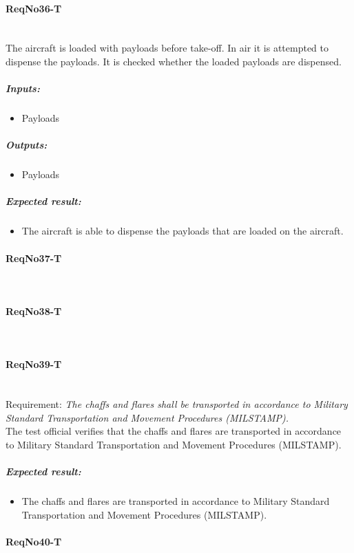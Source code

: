 \paragraph{ReqNo36-T}\mbox{}\\ %
The aircraft is loaded with payloads before take-off. In air it is attempted to dispense the payloads. It is checked whether the loaded payloads are dispensed.
\\
	\subparagraph{Inputs:}
	\begin{itemize}
	\item Payloads
	\end{itemize}
	\subparagraph{Outputs:}
	\begin{itemize}
	\item Payloads
	\end{itemize}
	\subparagraph{Expected result:}
	\begin{itemize}
	\item The aircraft is able to dispense the payloads that are loaded on the aircraft.
	\end{itemize}


\paragraph{ReqNo37-T}\mbox{}\\ %


\paragraph{ReqNo38-T}\mbox{}\\ %

\paragraph{ReqNo39-T}\mbox{}\\ %
Requirement: \textit{The chaffs and flares shall be transported in accordance to Military Standard Transportation and Movement Procedures (MILSTAMP).}\\

The test official verifies that the chaffs and flares are transported in accordance to Military Standard Transportation and Movement Procedures (MILSTAMP).

\subparagraph{Expected result:}
	\begin{itemize}
	\item The chaffs and flares are transported in accordance to Military Standard Transportation and Movement Procedures (MILSTAMP).
	\end{itemize}

\paragraph{ReqNo40-T}\mbox{}\\ %